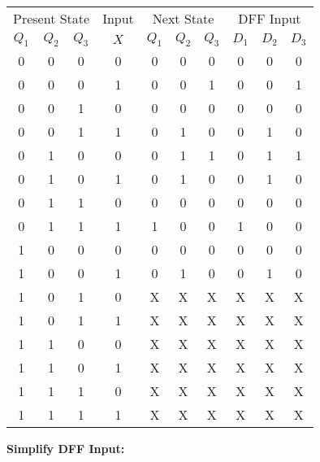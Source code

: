 \documentclass[a4paper,12pt]{article}
\begin{document}
\begin{center}
	\begin{tabular}{cccccccccc}
		\toprule
		\multicolumn{3}{c}{Present State} & Input & \multicolumn{3}{c}{Next State} & \multicolumn{3}{c}{DFF Input} \\
		\cmidrule(lr){1-3} \cmidrule(lr){4-4} \cmidrule(lr){5-7} \cmidrule(lr){8-10}
		$Q_1$ & $Q_2$ & $Q_3$ & $X$ & $Q_1$ & $Q_2$ & $Q_3$ & $D_1$ & $D_2$ & $D_3$ \\
		\midrule
		0 & 0 & 0 & 0 & 0 & 0 & 0 & 0 & 0 & 0 \\
		0 & 0 & 0 & 1 & 0 & 0 & 1 & 0 & 0 & 1 \\
		0 & 0 & 1 & 0 & 0 & 0 & 0 & 0 & 0 & 0 \\
		0 & 0 & 1 & 1 & 0 & 1 & 0 & 0 & 1 & 0 \\
		0 & 1 & 0 & 0 & 0 & 1 & 1 & 0 & 1 & 1 \\
		0 & 1 & 0 & 1 & 0 & 1 & 0 & 0 & 1 & 0 \\
		0 & 1 & 1 & 0 & 0 & 0 & 0 & 0 & 0 & 0 \\
		0 & 1 & 1 & 1 & 1 & 0 & 0 & 1 & 0 & 0 \\
		1 & 0 & 0 & 0 & 0 & 0 & 0 & 0 & 0 & 0 \\
		1 & 0 & 0 & 1 & 0 & 1 & 0 & 0 & 1 & 0 \\
		1 & 0 & 1 & 0 & X & X & X & X & X & X \\
		1 & 0 & 1 & 1 & X & X & X & X & X & X \\
		1 & 1 & 0 & 0 & X & X & X & X & X & X \\
		1 & 1 & 0 & 1 & X & X & X & X & X & X \\
		1 & 1 & 1 & 0 & X & X & X & X & X & X \\
		1 & 1 & 1 & 1 & X & X & X & X & X & X \\
		\bottomrule
	\end{tabular}
\end{center}

\newpage
\textbf{Simplify DFF Input:}
\end{document}
